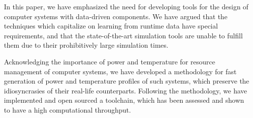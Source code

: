 In this paper, we have emphasized the need for developing tools for the design
of computer systems with data-driven components. We have argued that the
techniques which capitalize on learning from runtime data have special
requirements, and that the state-of-the-art simulation tools are unable to
fulfill them due to their prohibitively large simulation times.

Acknowledging the importance of power and temperature for resource management of
computer systems, we have developed a methodology for fast generation of power
and temperature profiles of such systems, which preserve the idiosyncrasies of
their real-life counterparts. Following the methodology, we have implemented and
open sourced a toolchain, which has been assessed and shown to have a high
computational throughput.
